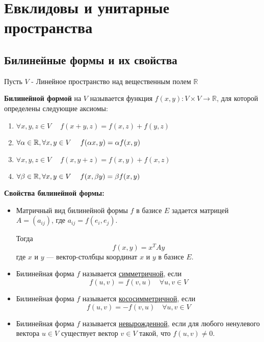 \chapter{Евклидовы и унитарные пространства}

\section{Билинейные формы и их свойства}

\large Пусть $V$ - Линейное пространство над вещественным полем $\mathbb{R}$

\vspace{0.5cm}


\begin{shdef}
    \begin{definition}
        \leavevmode\newline
        
        \textbf{Билинейной формой} на $V$ называется функция $f(x,y): V \times V \to \mathbb{R}$, для которой определены следующие аксиомы:
        \begin{enumerate}
            \item $\forall x,y,z \in V \quad \; f(x+y,z) = f(x, z) + f(y,z)$
            \item $\forall \alpha \in \mathbb{R}, \forall x,y \in V \quad \;  f(\alpha x, y) = \alpha f(x,y)$
            \item $\forall x, y, z \in V \quad \; f(x,y + z) = f(x,y) + f(x,z)$
            \item $\forall \beta \in \mathbb{R}, \forall x, y \in V \quad \; f(x, \beta y) = \beta f(x,y)$
        \end{enumerate}
    \end{definition}
\end{shdef}

\vspace{0.5cm}
\textbf{Свойства билинейной формы:}

\begin{itemize}
    \item Матричный вид билинейной формы $f$ в базисе $E$ задается матрицей $A = (a_{ij})$, где $a_{ij} = f(e_i, e_j)$. 

    Тогда
    \[
    f(x, y) = x^T A y
    \]
    где $x$ и $y$ — вектор-столбцы координат $x$ и $y$ в базисе $E$.
    \item Билинейная форма $f$ называется \underline{симметричной}, если
    \[
    f(u, v) = f(v, u) \quad \forall u, v \in V
    \]
    \item Билинейная форма $f$ называется \underline{кососимметричной}, если
    \[
    f(u, v) = -f(v, u) \quad \forall u, v \in V
    \]
    \item Билинейная форма $f$ называется \underline{невырожденной}, если для любого \newline ненулевого вектора $u \in V$ существует вектор $v \in V$ такой, что $f(u, v) \neq 0$.
\end{itemize}

